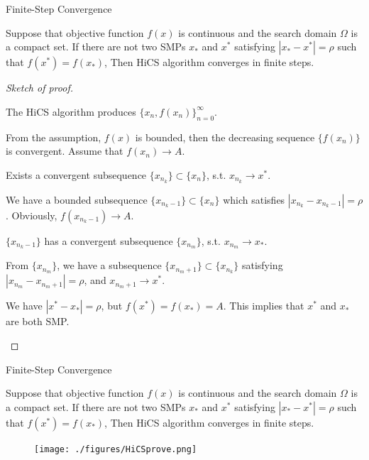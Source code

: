 \documentclass{beamer}
\begin{document}
\begin{frame}{Finite-Step Convergence}

\footnotesize{
\begin{theorem}
	Suppose that objective function $f(x)$ is continuous and the
	search domain $\Omega$ is a compact set.
	If there are not two SMPs $x_*$ and $x^*$ satisfying $|x_*-x^*|=\rho$
	such that $f(x^*)=f(x_*)$,
	Then HiCS algorithm converges in finite steps.
\end{theorem}
}
\pause
\vspace{-0.1cm}
\begin{proof}[Sketch of proof]
\begin{itemize}
\footnotesize{
	\item The HiCS algorithm produces $\{x_n,
		f(x_n)\}_{n=0}^{\infty}$.
	\item From the assumption, $f(x)$ is bounded, then
		the decreasing sequence $\{f(x_n)\}$ is convergent.
		Assume that $f(x_n)\rightarrow A$.
	\item Exists a convergent subsequence $\{x_{n_k}\}\subset
		\{x_n\}$, s.t.  $x_{n_k}\rightarrow x^*$. 
	\item We have a bounded subsequence
		$\{x_{n_{k}-1}\}\subset \{x_n\}$ which satisfies
		$|x_{n_k}-x_{n_{k}-1}|=\rho$. Obviously,
		$f(x_{{n_k}-1})\rightarrow A$.
	\item $\{x_{n_{k}-1}\}$ has a
		convergent subsequence $\{x_{n_{m}}\}$, s.t.
		$x_{n_{m}}\rightarrow x_*$.
	\item From $\{x_{n_{m}}\}$, we have a subsequence
		$\{x_{n_{m}+1}\}\subset\{ x_{n_k}\}$ satisfying
		$|x_{n_m}-x_{n_{m}+1}|=\rho$, and $x_{{n_m}+1}\rightarrow x^*$.
	\item We have $|x^* - x_*|=\rho$, but $f(x^*)=f(x_*)=A$. This
		implies that $x^*$ and $x_*$ are both SMP.
		}
\end{itemize}
\end{proof}

\end{frame}

\begin{frame}{Finite-Step Convergence}

\footnotesize{
\begin{theorem}
	Suppose that objective function $f(x)$ is continuous and the
	search domain $\Omega$ is a compact set.
	If there are not two SMPs $x_*$ and $x^*$ satisfying $|x_*-x^*|=\rho$
	such that $f(x^*)=f(x_*)$,
	Then HiCS algorithm converges in finite steps.
\end{theorem}
}
\begin{figure}[!htbp]
	\centering
	  \texttt{[image: ./figures/HiCSprove.png]}
\end{figure}

\end{frame}
\end{document}
